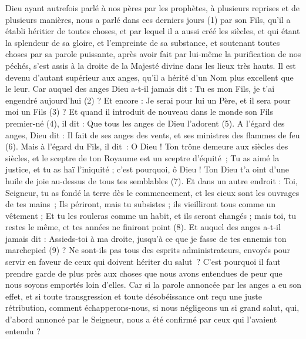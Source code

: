 \BFont
\begin{multicols}{2}
\TextTitle{[Introduction]}
\VerseOne{}Dieu ayant autrefois parlé à nos pères par les prophètes, à plusieurs reprises et de plusieurs manières,
nous a parlé dans ces derniers jours (1) par son Fils, qu'il a établi héritier de toutes choses, et par lequel il a aussi créé les siècles,
et qui étant la splendeur de sa gloire, et l'empreinte de sa substance, et soutenant toutes choses par sa parole puissante, après avoir fait par lui-même la purification de nos péchés, s'est assis à la droite de la Majesté divine dans les lieux très hauts.
Il est devenu d'autant supérieur aux anges, qu'il a hérité d’un Nom plus excellent que le leur.
Car auquel des anges Dieu a-t-il jamais dit : Tu es mon Fils, je t'ai engendré aujourd'hui (2) ? Et encore : Je serai pour lui un Père, et il sera pour moi un Fils (3) ?
Et quand il introduit de nouveau dans le monde son Fils premier-né (4), il dit : Que tous les anges de Dieu l'adorent (5).
A l’égard des anges, Dieu dit : Il fait de ses anges des vents, et ses ministres des flammes de feu (6).
Mais à l’égard du Fils, il dit : O Dieu ! Ton trône demeure aux siècles des siècles, et le sceptre de ton Royaume est un sceptre d'équité ;
Tu as aimé la justice, et tu as haï l'iniquité ; c'est pourquoi, ô Dieu ! Ton Dieu t'a oint d'une huile de joie au-dessus de tous tes semblables (7).
Et dans un autre endroit : Toi, Seigneur, tu as fondé la terre dès le commencement, et les cieux sont les ouvrages de tes mains ;
Ils périront, mais tu subsistes ; ils vieilliront tous comme un vêtement ;
Et tu les rouleras comme un habit, et ils seront changés ; mais toi, tu restes le même, et tes années ne finiront point (8).
Et auquel des anges a-t-il jamais dit : Assieds-toi à ma droite, jusqu'à ce que je fasse de tes ennemis ton marchepied (9) ?
Ne sont-ils pas tous des esprits administrateurs, envoyés pour servir en faveur de ceux qui doivent hériter du salut ?
\VerseOne{}C'est pourquoi il faut prendre garde de plus près aux choses que nous avons entendues de peur que nous soyons emportés loin d’elles.
Car si la parole annoncée par les anges a eu son effet, et si toute transgression et toute désobéissance ont reçu une juste rétribution,
comment échapperons-nous, si nous négligeons un si grand salut, qui, d’abord annoncé par le Seigneur, nous a été confirmé par ceux qui l'avaient entendu ?

\end{multicols}
